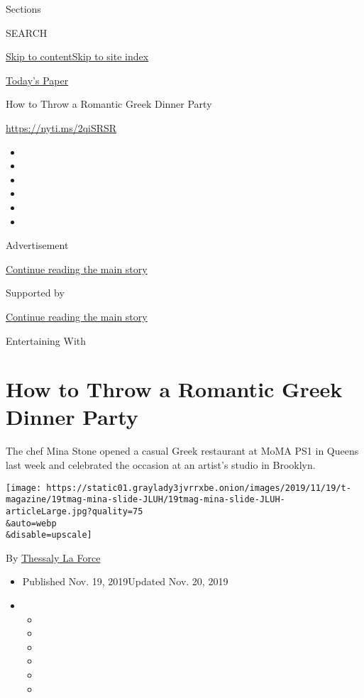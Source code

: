 Sections

SEARCH

\protect\hyperlink{site-content}{Skip to
content}\protect\hyperlink{site-index}{Skip to site index}

\href{https://myaccount.nytimes3xbfgragh.onion/auth/login?response_type=cookie\&client_id=vi}{}

\href{https://www.nytimes3xbfgragh.onion/section/todayspaper}{Today's
Paper}

How to Throw a Romantic Greek Dinner Party

\url{https://nyti.ms/2qiSRSR}

\begin{itemize}
\item
\item
\item
\item
\item
\item
\end{itemize}

Advertisement

\protect\hyperlink{after-top}{Continue reading the main story}

Supported by

\protect\hyperlink{after-sponsor}{Continue reading the main story}

Entertaining With

\hypertarget{how-to-throw-a-romantic-greek-dinner-party}{%
\section{How to Throw a Romantic Greek Dinner
Party}\label{how-to-throw-a-romantic-greek-dinner-party}}

The chef Mina Stone opened a casual Greek restaurant at MoMA PS1 in
Queens last week and celebrated the occasion at an artist's studio in
Brooklyn.

\texttt{[image: https://static01.graylady3jvrrxbe.onion/images/2019/11/19/t-magazine/19tmag-mina-slide-JLUH/19tmag-mina-slide-JLUH-articleLarge.jpg?quality=75\\\&auto=webp\\\&disable=upscale]}

By
\href{https://www.nytimes3xbfgragh.onion/by/thessaly-la-force}{Thessaly
La Force}

\begin{itemize}
\item
  Published Nov. 19, 2019Updated Nov. 20, 2019
\item
  \begin{itemize}
  \item
  \item
  \item
  \item
  \item
  \item
  \end{itemize}
\end{itemize}

